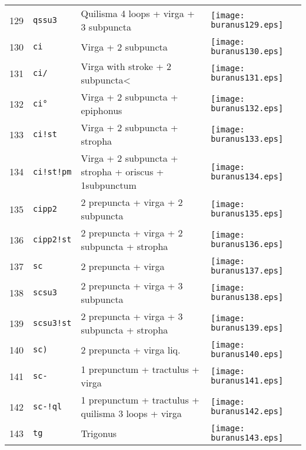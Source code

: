 \documentclass{scrarticle}
\begin{document}
\begin{longtable}{l|l|l|l}
129 & \texttt{qssu3} & Quilisma 4 loops + virga + 3 subpuncta & \texttt{[image: buranus129.eps]} \\
130 & \texttt{ci} & Virga + 2 subpuncta & \texttt{[image: buranus130.eps]} \\
131 & \texttt{ci/} & Virga with stroke + 2 subpuncta< & \texttt{[image: buranus131.eps]} \\
132 & \texttt{ci°} & Virga + 2 subpuncta + epiphonus & \texttt{[image: buranus132.eps]} \\
133 & \texttt{ci!st} & Virga + 2 subpuncta + stropha & \texttt{[image: buranus133.eps]} \\
134 & \texttt{ci!st!pm} & Virga + 2 subpuncta + stropha + oriscus + 1subpunctum & \texttt{[image: buranus134.eps]} \\
135 & \texttt{cipp2} & 2 prepuncta + virga + 2 subpuncta & \texttt{[image: buranus135.eps]} \\
136 & \texttt{cipp2!st} & 2 prepuncta + virga + 2 subpuncta + stropha & \texttt{[image: buranus136.eps]} \\
137 & \texttt{sc} & 2 prepuncta + virga & \texttt{[image: buranus137.eps]} \\
138 & \texttt{scsu3} & 2 prepuncta + virga + 3 subpuncta & \texttt{[image: buranus138.eps]} \\
139 & \texttt{scsu3!st} & 2 prepuncta + virga + 3 subpuncta + stropha & \texttt{[image: buranus139.eps]} \\
140 & \texttt{sc)} & 2 prepuncta + virga liq. & \texttt{[image: buranus140.eps]} \\
141 & \texttt{sc-} & 1 prepunctum + tractulus + virga & \texttt{[image: buranus141.eps]} \\
142 & \texttt{sc-!ql} & 1 prepunctum + tractulus + quilisma 3 loops + virga & \texttt{[image: buranus142.eps]} \\
143 & \texttt{tg} & Trigonus & \texttt{[image: buranus143.eps]} \\\end{longtable}
\end{document}
